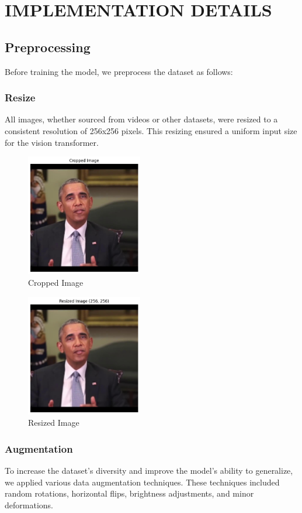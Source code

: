\section{IMPLEMENTATION DETAILS}
\subsection{Preprocessing}

Before training the model, we preprocess the dataset as follows:

\subsubsection{Resize}
All images, whether sourced from videos or other datasets, were resized to a consistent resolution of 256x256 pixels. This resizing ensured a uniform input size for the vision transformer.

\begin{figure}[ht]
    \centering
    \includegraphics[width=2in]{img/cropped.png}
    \caption{Cropped Image}
    \label{fig:cropped}
\end{figure}

\begin{figure}[ht]
    \centering
    \includegraphics[width=2in]{img/resized.png}
    \caption{Resized Image}
    \label{fig:resized}
\end{figure}

\subsubsection{Augmentation} To increase the dataset's diversity and improve the model's ability to generalize, we applied various data augmentation techniques. These techniques included random rotations, horizontal flips, brightness adjustments, and minor deformations.
\newpage

